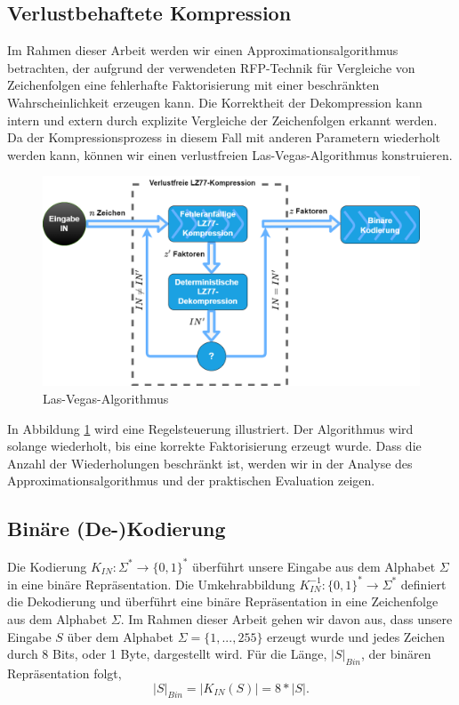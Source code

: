 \subsection{Verlustbehaftete Kompression}
Im Rahmen dieser Arbeit werden wir einen Approximationsalgorithmus betrachten, der aufgrund der verwendeten RFP-Technik für Vergleiche von Zeichenfolgen eine fehlerhafte Faktorisierung mit 
einer beschränkten Wahrscheinlichkeit erzeugen kann. Die Korrektheit der Dekompression kann intern und extern durch explizite Vergleiche der Zeichenfolgen erkannt werden. Da der
Kompressionsprozess in diesem Fall mit anderen Parametern wiederholt werden kann, können wir einen verlustfreien Las-Vegas-Algorithmus konstruieren.

\begin{figure}
    \centering
    \caption{Las-Vegas-Algorithmus}
    \label{fig:lasvegas}
    \includegraphics[scale=0.25]{Images/lasvegas_algorithm.png}
\end{figure}

In Abbildung \ref{fig:lasvegas} wird eine Regelsteuerung illustriert. Der Algorithmus wird solange wiederholt, bis eine korrekte Faktorisierung erzeugt wurde. Dass die
Anzahl der Wiederholungen beschränkt ist, werden wir in der Analyse des Approximationsalgorithmus und der praktischen Evaluation zeigen.

\subsection{Binäre (De-)Kodierung}
Die Kodierung $K_{IN}: \Sigma^* \rightarrow \{0,1\}^*$ überführt unsere Eingabe aus dem Alphabet $\Sigma$ in eine binäre Repräsentation.
Die Umkehrabbildung $K^{-1}_{IN}: \{0,1\}^* \rightarrow \Sigma^*$ definiert die Dekodierung und überführt eine binäre Repräsentation in eine Zeichenfolge
aus dem Alphabet $\Sigma$. Im Rahmen dieser Arbeit gehen wir davon aus, dass unsere Eingabe $S$ über dem Alphabet $\Sigma=\{1,...,255\}$ erzeugt wurde und 
jedes Zeichen durch 8 Bits, oder 1 Byte, dargestellt wird. Für die Länge, $|S|_{Bin}$, der binären Repräsentation folgt,
\begin{equation}
    |S|_{Bin} = |K_{IN}(S)| = 8*|S|.
\end{equation}

